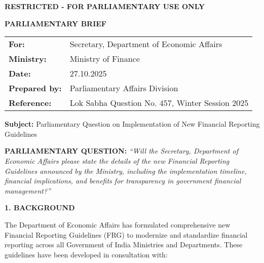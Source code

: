 \documentclass[12pt,a4paper]{article}
\newcommand{\briefheader}[1]{\textbf{\color{restrictedred}#1}}
\newcommand{\sectionheader}[1]{\textbf{#1}}
\newcommand{\datapoint}[1]{\textit{#1}}
\begin{document}
\begin{center}
    {\Large \color{restrictedred} \textbf{RESTRICTED - FOR PARLIAMENTARY USE ONLY}}
\end{center}

\vspace{0.5cm}

\begin{center}
    {\large \textbf{PARLIAMENTARY BRIEF}}
\end{center}

\vspace{0.3cm}

\begin{table}[h]
\centering
\begin{tabular}{@{}ll@{}}
\toprule
\textbf{For:} & Secretary, Department of Economic Affairs \\
\textbf{Ministry:} & Ministry of Finance \\
\textbf{Date:} & 27.10.2025 \\
\textbf{Prepared by:} & Parliamentary Affairs Division \\
\textbf{Reference:} & Lok Sabha Question No. 457, Winter Session 2025 \\
\bottomrule
\end{tabular}
\end{table}

\vspace{0.5cm}

\briefheader{Subject:} Parliamentary Question on Implementation of New Financial Reporting Guidelines

\vspace{0.5cm}

\sectionheader{PARLIAMENTARY QUESTION:}
\datapoint{``Will the Secretary, Department of Economic Affairs please state the details of the new Financial Reporting Guidelines announced by the Ministry, including the implementation timeline, financial implications, and benefits for transparency in government financial management?''}

\vspace{0.5cm}

\sectionheader{1. BACKGROUND}

The Department of Economic Affairs has formulated comprehensive new Financial Reporting Guidelines (FRG) to modernize and standardize financial reporting across all Government of India Ministries and Departments. These guidelines have been developed in consultation with:
\end{document}
